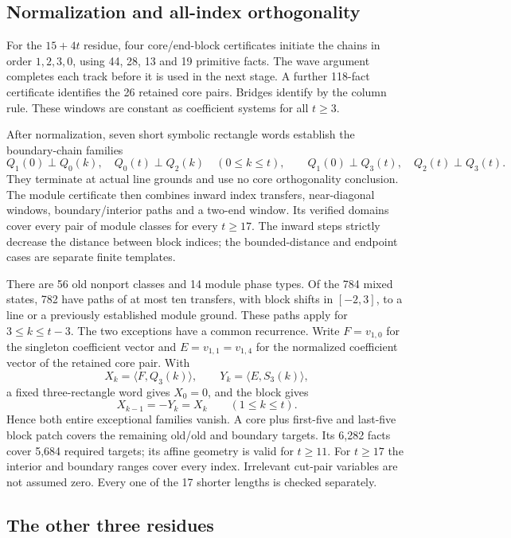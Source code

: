 \documentclass[11pt,a4paper]{article}
\theoremstyle{definition}
\begin{document}
\subsection{Normalization and all-index orthogonality}

For the $15+4t$ residue, four core/end-block certificates initiate the
chains in order $1,2,3,0$, using 44, 28, 13 and 19 primitive facts.
The wave argument completes each track before it is used in the next
stage. A further 118-fact certificate identifies the 26 retained core
pairs. Bridges identify by the column rule. These windows are constant
as coefficient systems for all $t\ge3$.

After normalization, seven short symbolic rectangle words establish
the boundary-chain families
\[
 Q_1(0)\perp Q_0(k),\quad Q_0(t)\perp Q_2(k)
 \quad(0\le k\le t),\qquad
 Q_1(0)\perp Q_3(t),\quad Q_2(t)\perp Q_3(t).
\]
They terminate at actual line grounds and use no core orthogonality
conclusion. The module certificate then combines inward index
transfers, near-diagonal windows, boundary/interior paths and a
two-end window. Its verified domains cover every pair of module
classes for every $t\ge17$. The inward steps strictly decrease the
distance between block indices; the bounded-distance and endpoint
cases are separate finite templates.

There are 56 old nonport classes and 14 module phase types. Of the
784 mixed states, 782 have paths of at most ten transfers, with block
shifts in $[-2,3]$, to a line or a previously established module ground.
These paths apply for $3\le k\le t-3$. The two exceptions have a
common recurrence. Write $F=v_{1,0}$ for the singleton coefficient vector
and $E=v_{1,1}=v_{1,4}$ for the normalized coefficient vector of the
retained core pair. With
\[
 X_k=\langle F,Q_3(k)\rangle,\qquad
 Y_k=\langle E,S_3(k)\rangle,
\]
a fixed three-rectangle word gives $X_0=0$, and the block gives
\begin{equation}\label{eq:sixexception}
 X_{k-1}=-Y_k=X_k\qquad(1\le k\le t).
\end{equation}
Hence both entire exceptional families vanish. A core plus first-five
and last-five block patch covers the remaining old/old and boundary
targets. Its 6,282 facts cover 5,684 required targets; its affine
geometry is valid for $t\ge11$. For $t\ge17$ the interior and boundary
ranges cover every index. Irrelevant cut-pair variables are not assumed
zero. Every one of the 17 shorter lengths is checked separately.

\subsection{The other three residues}
\end{document}
